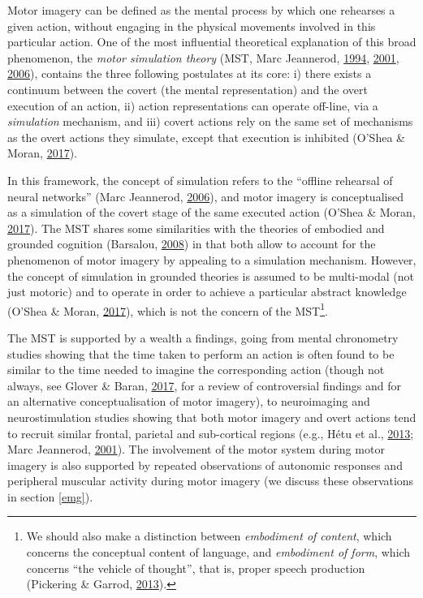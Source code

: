 \documentclass[a4paper,12pt,twoside,openright,oldfontcommands]{memoir}
\let\rmarkdownfootnote\footnote%
\def\footnote{\protect\rmarkdownfootnote}
\begin{document}
Motor imagery can be defined as the mental process by which one
rehearses a given action, without engaging in the physical movements
involved in this particular action. One of the most influential
theoretical explanation of this broad phenomenon, the \emph{motor
simulation theory} (MST, Marc Jeannerod,
\protect\hyperlink{ref-jeannerod_representing_1994}{1994},
\protect\hyperlink{ref-jeannerod_neural_2001}{2001},
\protect\hyperlink{ref-jeannerod_motor_2006}{2006}), contains the three
following postulates at its core: i) there exists a continuum between
the covert (the mental representation) and the overt execution of an
action, ii) action representations can operate off-line, via a
\emph{simulation} mechanism, and iii) covert actions rely on the same
set of mechanisms as the overt actions they simulate, except that
execution is inhibited (O'Shea \& Moran,
\protect\hyperlink{ref-oshea_does_2017}{2017}).

In this framework, the concept of simulation refers to the ``offline
rehearsal of neural networks'' (Marc Jeannerod,
\protect\hyperlink{ref-jeannerod_motor_2006}{2006}), and motor imagery
is conceptualised as a simulation of the covert stage of the same
executed action (O'Shea \& Moran,
\protect\hyperlink{ref-oshea_does_2017}{2017}). The MST shares some
similarities with the theories of embodied and grounded cognition
(Barsalou, \protect\hyperlink{ref-Barsalou2008}{2008}) in that both
allow to account for the phenomenon of motor imagery by appealing to a
simulation mechanism. However, the concept of simulation in grounded
theories is assumed to be multi-modal (not just motoric) and to operate
in order to achieve a particular abstract knowledge (O'Shea \& Moran,
\protect\hyperlink{ref-oshea_does_2017}{2017}), which is not the concern
of the MST\footnote{We should also make a distinction between
  \emph{embodiment of content}, which concerns the conceptual content of
  language, and \emph{embodiment of form}, which concerns ``the vehicle
  of thought'', that is, proper speech production (Pickering \& Garrod,
  \protect\hyperlink{ref-pickering_integrated_2013}{2013}).}.

The MST is supported by a wealth a findings, going from mental
chronometry studies showing that the time taken to perform an action is
often found to be similar to the time needed to imagine the
corresponding action (though not always, see Glover \& Baran,
\protect\hyperlink{ref-glover_motor-cognitive_2017}{2017}, for a review
of controversial findings and for an alternative conceptualisation of
motor imagery), to neuroimaging and neurostimulation studies showing
that both motor imagery and overt actions tend to recruit similar
frontal, parietal and sub-cortical regions (e.g., Hétu et al.,
\protect\hyperlink{ref-hetu_neural_2013}{2013}; Marc Jeannerod,
\protect\hyperlink{ref-jeannerod_neural_2001}{2001}). The involvement of
the motor system during motor imagery is also supported by repeated
observations of autonomic responses and peripheral muscular activity
during motor imagery (we discuss these observations in section
\ref{emg}).
\end{document}
